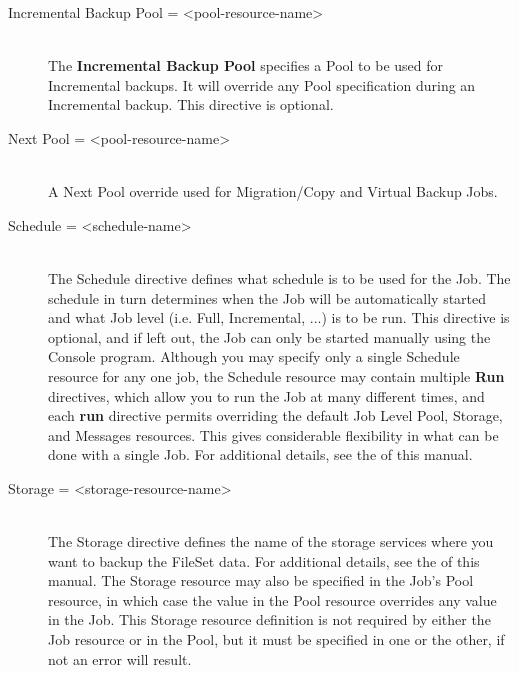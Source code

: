 \begin{description}
\item [Incremental Backup Pool = {\textless}pool-resource-name{\textgreater}] \hfill \\
The {\bf Incremental Backup Pool} specifies a Pool to be used for
Incremental backups.  It will override any Pool specification during an
Incremental backup.  This directive is optional.

\item [Next Pool = {\textless}pool-resource-name{\textgreater}] \hfill \\
A Next Pool override used for Migration/Copy and Virtual Backup Jobs.

\item [Schedule = {\textless}schedule-name{\textgreater}] \hfill \\
The Schedule directive defines what schedule is to be used for the Job.
The schedule in turn determines when the Job will be automatically
started and what Job level (i.e.  Full, Incremental, ...) is to be run.
This directive is optional, and if left out, the Job can only be started
manually using the Console program.  Although you may specify only a
single Schedule resource for any one job, the Schedule resource may
contain multiple {\bf Run} directives, which allow you to run the Job at
many different times, and each {\bf run} directive permits overriding
the default Job Level Pool, Storage, and Messages resources.  This gives
considerable flexibility in what can be done with a single Job.  For
additional details, see the  of this manual.

\item [Storage = {\textless}storage-resource-name{\textgreater}] \hfill \\
The Storage directive defines the name of the storage services where you
want to backup the FileSet data.  For additional details, see the
 of this manual.
The Storage resource may also be specified in the Job's Pool resource,
in which case the value in the Pool resource overrides any value
in the Job. This Storage resource definition is not required by either
the Job resource or in the Pool, but it must be specified in
one or the other, if not an error will result.


\end{description}
